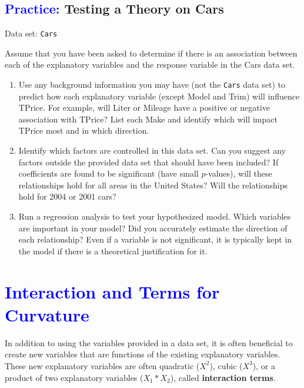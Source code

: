 \documentclass[
]{report}
\begin{document}
\hypertarget{testing-a-theory-on-cars}{%
\subsection*{\texorpdfstring{\textcolor{blue}{Practice:} Testing a Theory on Cars}{ Testing a Theory on Cars}}\label{testing-a-theory-on-cars}}

\vspace{-1em}

Data set: \texttt{Cars}

Assume that you have been asked to determine if there is an association between each of the explanatory variables and the response variable in the Cars data set.

\begin{enumerate}
\def\labelenumi{\arabic{enumi}.}
\setcounter{enumi}{31}
\item
  Use any background information you may have (not the \texttt{Cars} data set) to predict how each explanatory variable (except Model and Trim) will influence TPrice. For example, will Liter or Mileage have a positive or negative association with TPrice? List each Make and identify which will impact TPrice most and in which direction.
\item
  Identify which factors are controlled in this data set. Can you suggest any factors outside the provided data set that should have been included? If coefficients are found to be significant (have small \(\scriptstyle p\)-values), will these relationships hold for all areas in the United States? Will the relationships hold for 2004 or 2001 cars?
\item
  Run a regression analysis to test your hypothesized model. Which variables are important in your model? Did you accurately estimate the direction of each relationship? Even if a variable is not significant, it is typically kept in the model if there is a theoretical justification
  for it.
\end{enumerate}

\hypertarget{section-36}{%
\section{\texorpdfstring{\textcolor{blue}{Interaction and Terms for Curvature}}{}}\label{section-36}}

In addition to using the variables provided in a data set, it is often beneficial to create new variables that are functions of the existing explanatory variables. These new explanatory variables are often quadratic (\(\scriptstyle X^2\)), cubic (\(\scriptstyle X^3\)), or a product of two explanatory variables (\(\scriptstyle X_1*X_2\)), called \textbf{interaction terms}.
\end{document}
